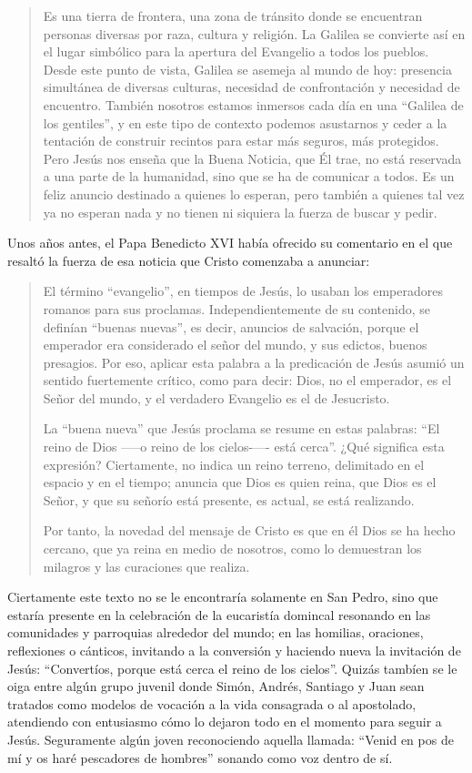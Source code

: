 \blockquote[{\cite{francisco2014angelus}}]{Es una tierra de frontera, una zona
  de tránsito donde se encuentran personas diversas por raza, cultura y
  religión. La Galilea se convierte así en el lugar simbólico para la apertura
  del Evangelio a todos los pueblos. Desde este punto de vista, Galilea se
  asemeja al mundo de hoy: presencia simultánea de diversas culturas, necesidad
  de confrontación y necesidad de encuentro. También nosotros estamos inmersos
  cada día en una \enquote{Galilea de los gentiles}, y en este tipo de contexto
  podemos asustarnos y ceder a la tentación de construir recintos para estar más
  seguros, más protegidos. Pero Jesús nos enseña que la Buena Noticia, que Él
  trae, no está reservada a una parte de la humanidad, sino que se ha de
  comunicar a todos. Es un feliz anuncio destinado a quienes lo esperan, pero
  también a quienes tal vez ya no esperan nada y no tienen ni siquiera la fuerza
  de buscar y pedir.}

Unos años antes, el Papa Benedicto XVI había ofrecido su comentario en el que
resaltó la fuerza de esa noticia que Cristo comenzaba a anunciar:

\blockquote[{\cite{benedicto2008angelus}}]{El término \enquote{evangelio}, en
  tiempos de Jesús, lo usaban los emperadores romanos para sus proclamas.
  Independientemente de su contenido, se definían \enquote{buenas nuevas}, es
  decir, anuncios de salvación, porque el emperador era considerado el señor del
  mundo, y sus edictos, buenos presagios. Por eso, aplicar esta
  palabra a la predicación de Jesús asumió un sentido fuertemente crítico, como
  para decir: Dios, no el emperador, es el Señor del mundo, y el verdadero
  Evangelio es el de Jesucristo.

  La \enquote{buena nueva} que Jesús proclama se resume en estas palabras:
  \enquote{El reino de Dios —--o reino de los cielos-—- está cerca}. ¿Qué
  significa esta expresión? Ciertamente, no indica un reino terreno, delimitado
  en el espacio y en el tiempo; anuncia que Dios es quien reina, que Dios es el
  Señor, y que su señorío está presente, es actual, se está realizando.

  Por tanto, la novedad del mensaje de Cristo es que en él Dios se ha hecho
  cercano, que ya reina en medio de nosotros, como lo demuestran los milagros y
  las curaciones que realiza.}

Ciertamente este texto no se le encontraría solamente en San Pedro, sino que
estaría presente en la celebración de la eucaristía domincal resonando en las
comunidades y parroquias alrededor del mundo; en las homilias, oraciones,
reflexiones o cánticos, invitando a la conversión y haciendo nueva la invitación
de Jesús: \enquote{Convertíos, porque está cerca el reino de los cielos}. Quizás
tambíen se le oiga entre algún grupo juvenil donde Simón, Andrés, Santiago y
Juan sean tratados como modelos de vocación a la vida consagrada o al
apostolado, atendiendo con entusiasmo cómo lo dejaron todo en el momento para
seguir a Jesús. Seguramente algún joven reconociendo aquella llamada:
\enquote{Venid en pos de mí y os haré pescadores de hombres} sonando como voz
dentro de sí.

